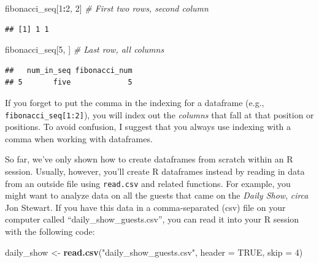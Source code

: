 \documentclass[]{book}
\makeatletter
\newenvironment{Shaded}{\begin{snugshade}}{\end{snugshade}}
\newcommand{\KeywordTok}[1]{\textcolor[rgb]{0.13,0.29,0.53}{\textbf{#1}}}
\newcommand{\DataTypeTok}[1]{\textcolor[rgb]{0.13,0.29,0.53}{#1}}
\newcommand{\DecValTok}[1]{\textcolor[rgb]{0.00,0.00,0.81}{#1}}
\newcommand{\StringTok}[1]{\textcolor[rgb]{0.31,0.60,0.02}{#1}}
\newcommand{\CommentTok}[1]{\textcolor[rgb]{0.56,0.35,0.01}{\textit{#1}}}
\newcommand{\OtherTok}[1]{\textcolor[rgb]{0.56,0.35,0.01}{#1}}
\newcommand{\OperatorTok}[1]{\textcolor[rgb]{0.81,0.36,0.00}{\textbf{#1}}}
\newcommand{\NormalTok}[1]{#1}
\newenvironment{kframe}{%
\medskip{}
\setlength{\fboxsep}{.8em}
 \def\at@end@of@kframe{}%
 \ifinner\ifhmode%
  \def\at@end@of@kframe{\end{minipage}}%
  \begin{minipage}{\columnwidth}%
 \fi\fi%
 \def\FrameCommand##1{\hskip\@totalleftmargin \hskip-\fboxsep
 \colorbox{shadecolor}{##1}\hskip-\fboxsep
     \hskip-\linewidth \hskip-\@totalleftmargin \hskip\columnwidth}%
 \MakeFramed {\advance\hsize-\width
   \@totalleftmargin\z@ \linewidth\hsize
   \@setminipage}}%
 {\par\unskip\endMakeFramed%
 \at@end@of@kframe}
\renewenvironment{Shaded}{\begin{kframe}}{\end{kframe}}
\newenvironment{rmdblock}[1]
  {
  \begin{itemize}
  \renewcommand{\labelitemi}{
    \raisebox{-.7\height}[0pt][0pt]{
      {\setkeys{Gin}{width=3em,keepaspectratio}\texttt{[image: images/\#1]}}
    }
  }
  \setlength{\fboxsep}{1em}
  \begin{kframe}
  \item
  }
  {
  \end{kframe}
  \end{itemize}
  }
\newenvironment{rmdnote}
  {\begin{rmdblock}{note}}
  {\end{rmdblock}}
\theoremstyle{definition}
\theoremstyle{definition}
\theoremstyle{definition}
\theoremstyle{remark}
\makeatother
\begin{document}
\begin{Shaded}
\begin{Highlighting}[]
\NormalTok{fibonacci_seq[}\DecValTok{1}\OperatorTok{:}\DecValTok{2}\NormalTok{, }\DecValTok{2}\NormalTok{] }\CommentTok{# First two rows, second column}
\end{Highlighting}
\end{Shaded}

\begin{verbatim}
## [1] 1 1
\end{verbatim}

\begin{Shaded}
\begin{Highlighting}[]
\NormalTok{fibonacci_seq[}\DecValTok{5}\NormalTok{, ] }\CommentTok{# Last row, all columns}
\end{Highlighting}
\end{Shaded}

\begin{verbatim}
##   num_in_seq fibonacci_num
## 5       five             5
\end{verbatim}

\begin{rmdnote}
If you forget to put the comma in the indexing for a dataframe (e.g.,
\texttt{fibonacci\_seq{[}1:2{]}}), you will index out the \emph{columns}
that fall at that position or positions. To avoid confusion, I suggest
that you always use indexing with a comma when working with dataframes.
\end{rmdnote}

So far, we've only shown how to create dataframes from scratch within an
R session. Usually, however, you'll create R dataframes instead by
reading in data from an outside file using \texttt{read.csv} and related
functions. For example, you might want to analyze data on all the guests
that came on the \emph{Daily Show}, \emph{circa} Jon Stewart. If you
have this data in a comma-separated (csv) file on your computer called
``daily\_show\_guests.csv'', you can read it into your R session with
the following code:

\begin{Shaded}
\begin{Highlighting}[]
\NormalTok{daily_show <-}\StringTok{ }\KeywordTok{read.csv}\NormalTok{(}\StringTok{"daily_show_guests.csv"}\NormalTok{,}
                       \DataTypeTok{header =} \OtherTok{TRUE}\NormalTok{,}
                       \DataTypeTok{skip =} \DecValTok{4}\NormalTok{)}
\end{Highlighting}
\end{Shaded}
\end{document}
